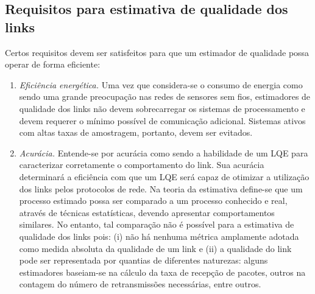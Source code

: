 \documentclass[
	12pt,				%
	openright,			%
	oneside,
	a4paper,			%
	english,			%
	french,				%
	spanish,			%
	brazil				%
	]{abntex2}
\begin{document}
\subsection{Requisitos para estimativa de qualidade dos links}

Certos requisitos devem ser satisfeitos para que um estimador de qualidade possa operar de forma eficiente:

\begin{enumerate}
	\item \textit{Eficiência energética.} Uma vez que considera-se o consumo de energia como sendo uma grande preocupação nas redes de sensores sem fios, estimadores de qualidade dos links não devem sobrecarregar os sistemas de processamento e devem requerer o mínimo possível de comunicação adicional. Sistemas ativos com altas taxas de amostragem, portanto, devem ser evitados.
	\item \textit{Acurácia.} Entende-se por acurácia como sendo a habilidade de um LQE para caracterizar corretamente o comportamento do link. Sua acurácia determinará a eficiência com que um LQE será capaz de otimizar a utilização dos links pelos protocolos de rede. Na teoria da estimativa define-se que um processo estimado possa ser comparado a um processo conhecido e real, através de técnicas estatísticas, devendo apresentar comportamentos similares. No entanto, tal comparação não é possível para a estimativa de qualidade dos links pois: (i) não há nenhuma métrica amplamente adotada como medida absoluta da qualidade de um link e (ii) a qualidade do link pode ser representada por quantias de diferentes naturezas: alguns estimadores baseiam-se na cálculo da taxa de recepção de pacotes, outros na contagem do número de retransmissões necessárias, entre outros. 


\end{enumerate}
\end{document}
